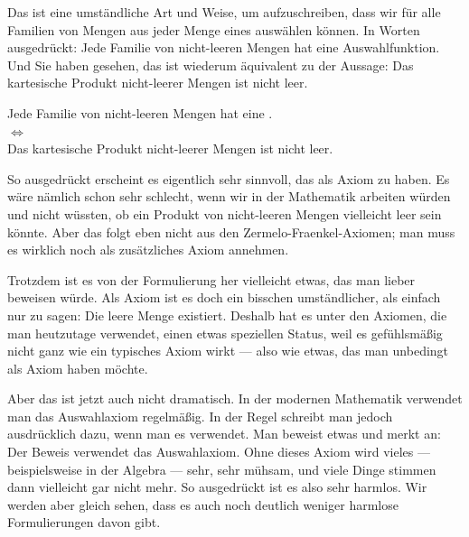 \begin{spoken-clean}[00:02:40 - 00:03:50]
Das ist eine umständliche Art und Weise, um aufzuschreiben, dass wir für alle Familien von Mengen aus jeder Menge eines auswählen können. In Worten ausgedrückt: Jede Familie von nicht-leeren Mengen hat eine Auswahlfunktion. Und Sie haben gesehen, das ist wiederum äquivalent zu der Aussage: Das kartesische Produkt nicht-leerer Mengen ist nicht leer.
\end{spoken-clean}

\begin{math-stroke}
\begin{center}
Jede Familie von nicht-leeren Mengen hat eine . \\
$\iff$ \\
Das kartesische Produkt nicht-leerer Mengen ist nicht leer.
\end{center}
\end{math-stroke}

\begin{spoken-clean}[00:03:50 - 00:05:30]
So ausgedrückt erscheint es eigentlich sehr sinnvoll, das als Axiom zu haben. Es wäre nämlich schon sehr schlecht, wenn wir in der Mathematik arbeiten würden und nicht wüssten, ob ein Produkt von nicht-leeren Mengen vielleicht leer sein könnte. Aber das folgt eben nicht aus den Zermelo-Fraenkel-Axiomen; man muss es wirklich noch als zusätzliches Axiom annehmen.

Trotzdem ist es von der Formulierung her vielleicht etwas, das man lieber beweisen würde. Als Axiom ist es doch ein bisschen umständlicher, als einfach nur zu sagen: Die leere Menge existiert. Deshalb hat es unter den Axiomen, die man heutzutage verwendet, einen etwas speziellen Status, weil es gefühlsmäßig nicht ganz wie ein typisches Axiom wirkt --- also wie etwas, das man unbedingt als Axiom haben möchte.

Aber das ist jetzt auch nicht dramatisch. In der modernen Mathematik verwendet man das Auswahlaxiom regelmäßig. In der Regel schreibt man jedoch ausdrücklich dazu, wenn man es verwendet. Man beweist etwas und merkt an: Der Beweis verwendet das Auswahlaxiom. Ohne dieses Axiom wird vieles --- beispielsweise in der Algebra --- sehr, sehr mühsam, und viele Dinge stimmen dann vielleicht gar nicht mehr. So ausgedrückt ist es also sehr harmlos. Wir werden aber gleich sehen, dass es auch noch deutlich weniger harmlose Formulierungen davon gibt.
\end{spoken-clean}

